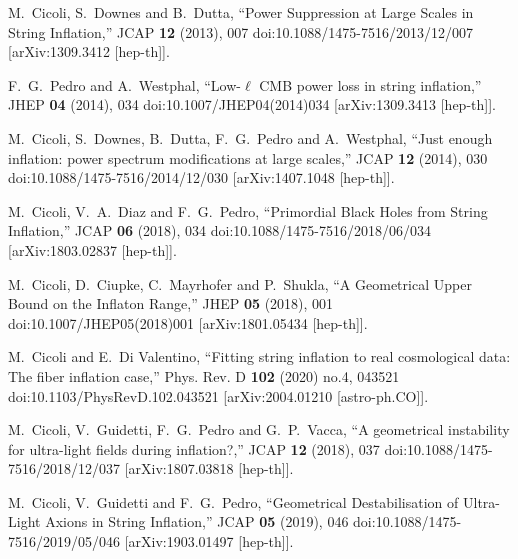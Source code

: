 \documentclass[aps,prd,a4paper,twocolumn,amsmath,showpacs,superscriptaddress,nofootinbib,preprintnumbers]{revtex4-1}
\begin{document}
\begin{thebibliography}{99}
M.~Cicoli, S.~Downes and B.~Dutta,
``Power Suppression at Large Scales in String Inflation,''
JCAP \textbf{12} (2013), 007
doi:10.1088/1475-7516/2013/12/007
[arXiv:1309.3412 [hep-th]].

F.~G.~Pedro and A.~Westphal,
``Low-$\ell$ CMB power loss in string inflation,''
JHEP \textbf{04} (2014), 034
doi:10.1007/JHEP04(2014)034
[arXiv:1309.3413 [hep-th]].

M.~Cicoli, S.~Downes, B.~Dutta, F.~G.~Pedro and A.~Westphal,
``Just enough inflation: power spectrum modifications at large scales,''
JCAP \textbf{12} (2014), 030
doi:10.1088/1475-7516/2014/12/030
[arXiv:1407.1048 [hep-th]].

M.~Cicoli, V.~A.~Diaz and F.~G.~Pedro,
``Primordial Black Holes from String Inflation,''
JCAP \textbf{06} (2018), 034
doi:10.1088/1475-7516/2018/06/034
[arXiv:1803.02837 [hep-th]].

M.~Cicoli, D.~Ciupke, C.~Mayrhofer and P.~Shukla,
``A Geometrical Upper Bound on the Inflaton Range,''
JHEP \textbf{05} (2018), 001
doi:10.1007/JHEP05(2018)001
[arXiv:1801.05434 [hep-th]].

M.~Cicoli and E.~Di Valentino,
``Fitting string inflation to real cosmological data: The fiber inflation case,''
Phys. Rev. D \textbf{102} (2020) no.4, 043521
doi:10.1103/PhysRevD.102.043521
[arXiv:2004.01210 [astro-ph.CO]].

M.~Cicoli, V.~Guidetti, F.~G.~Pedro and G.~P.~Vacca,
``A geometrical instability for ultra-light fields during inflation?,''
JCAP \textbf{12} (2018), 037
doi:10.1088/1475-7516/2018/12/037
[arXiv:1807.03818 [hep-th]].

M.~Cicoli, V.~Guidetti and F.~G.~Pedro,
``Geometrical Destabilisation of Ultra-Light Axions in String Inflation,''
JCAP \textbf{05} (2019), 046
doi:10.1088/1475-7516/2019/05/046
[arXiv:1903.01497 [hep-th]].


\end{thebibliography}
\end{document}
